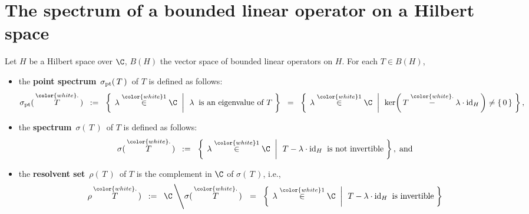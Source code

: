 

\section{The spectrum of a bounded linear operator on a Hilbert space}
\setcounter{theorem}{0}
\setcounter{equation}{0}


\renewcommand{\theenumi}{\roman{enumi}}
\renewcommand{\labelenumi}{\textnormal{(\theenumi)}$\;\;$}


\begin{definition}\mbox{}
\vskip 0.1cm
\noindent
Let $H$ be a Hilbert space over $\C$, $B(H)$ the vector space of bounded linear operators on $H$.
For each $T \in B(H)$,
\begin{itemize}
\item
	the \textbf{point spectrum} \,$\sigma_{\textnormal{pt}}(\,T\,)$\, of $T$ is defined as follows:
	\begin{equation*}
	\sigma_{\textnormal{pt}}(\,\overset{{\color{white}.}}{T}\,)
	\;\; := \;\;
		\left\{\;
			\left.
				\lambda \overset{{\color{white}1}}{\in} \C
		\;\;\right\vert\;\,
			\lambda \;\;\textnormal{is an eigenvalue of $T$}
			\;\right\}
	\;\; = \;\;
		\left\{\;
			\left.
				\lambda \overset{{\color{white}1}}{\in} \C
		\;\;\right\vert\;\,
			\ker\!\left(\,T \overset{{\color{white}.}}{-} \lambda \cdot \textnormal{id}_{H}\,\right) \neq \{\,0\,\}
			\;\right\},
	\end{equation*}
\item
	the \textbf{spectrum} \,$\sigma(\,T\,)$\, of $T$ is defined as follows:
	\begin{equation*}
	\sigma(\,\overset{{\color{white}.}}{T}\,)
	\;\; := \;\;
		\left\{\;
			\left.
				\lambda \overset{{\color{white}1}}{\in} \C
		\;\;\right\vert\;\,
			T - \lambda \cdot \textnormal{id}_{H} \;\;\textnormal{is not invertible}
			\;\right\},
	\;\textnormal{and}
	\end{equation*}
\item
	the \textbf{resolvent set} \,$\rho(\,T\,)$\, of $T$ is the complement in $\C$ of $\sigma(\,T\,)$, i.e.,
	\begin{equation*}
	\rho\,\overset{{\color{white}.}}{T}\,)
	\;\; := \;\;
		\C \left\backslash \sigma(\,\overset{{\color{white}.}}{T}\,)\right.
	\;\; = \;\;
		\left\{\;
			\left.
			\lambda \overset{{\color{white}1}}{\in} \C
			\;\;\right\vert\;\,
			T - \lambda \cdot \textnormal{id}_{H} \;\;\textnormal{is invertible}
			\;\right\}
	\end{equation*}
\end{itemize}
\end{definition}


